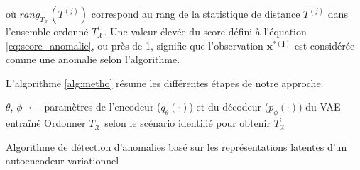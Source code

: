 où $rang_{T^{'}_{\mathcal{X}}}(T^{(j)})$ correspond au rang de la statistique de distance $T^{(j)}$ dans l'ensemble ordonné $T^{'}_{\mathcal{X}}$. Une valeur élevée du score défini à l'équation \ref{eq:score_anomalie}, ou près de 1, signifie que l'observation $\boldsymbol{x^{*(j)}}$ est considérée comme une anomalie selon l'algorithme.

L'algorithme \ref{alg:metho} résume les différentes étapes de notre approche.

\begin{center}
	\begin{algorithm}[H] \label{alg:metho}
		\SetAlgoLined
		$\theta$, $\phi$ $\leftarrow$ paramètres de l'encodeur ($q_{\theta}(\cdot)$) et du  décodeur ($p_{\phi}(\cdot)$) du VAE entraîné\;
		Ordonner $T_{\mathcal{X}}$ selon le scénario identifié pour obtenir $T^{'}_{\mathcal{X}}$ \;
		\caption{Algorithme de détection d'anomalies basé sur les représentations latentes d'un autoencodeur variationnel}
	\end{algorithm}
\end{center}

\DIFaddbegin {}\DIFaddend